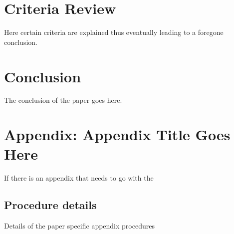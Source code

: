 \section{Criteria Review}

Here certain criteria are explained thus eventually
leading to a foregone conclusion.

\section{Conclusion}\label{Conclusion1}

The conclusion of the paper goes here.

\autocite{zieglerLecturesPolytopes1995}
\autocite{superLong}

\printbibliography[heading=subbibnumbered]

\section{Appendix: Appendix Title Goes Here}
If there is an appendix that needs to go with the

\subsection{Procedure details}
Details of the paper specific appendix procedures
